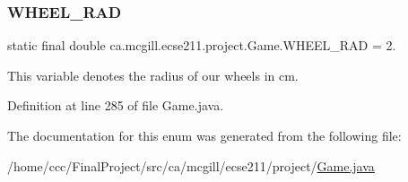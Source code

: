 \subsubsection{\texorpdfstring{W\+H\+E\+E\+L\+\_\+\+R\+AD}{WHEEL\_RAD}}
{\footnotesize\ttfamily  static  final double ca.\+mcgill.\+ecse211.\+project.\+Game.\+W\+H\+E\+E\+L\+\_\+\+R\+AD = 2.\hspace{0.3cm}{\ttfamily [static]}}

This variable denotes the radius of our wheels in cm. 

Definition at line 285 of file Game.\+java.



The documentation for this enum was generated from the following file\+:\begin{DoxyCompactItemize}
\item 
/home/ccc/\+Final\+Project/src/ca/mcgill/ecse211/project/\hyperlink{_game_8java}{Game.\+java}\end{DoxyCompactItemize}
